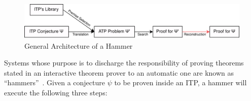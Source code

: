 \begin{figure}[t]
  \includegraphics[scale=0.15]{img/hammerArch.png}
  \caption{General Architecture of a Hammer}\label{fig:archHamm}
\end{figure}

\label{sec:hammering}


Systems whose purpose is to discharge the responsibility of proving theorems stated in
an interactive theorem prover to an automatic one are known as ``hammers''~\cite{hammering}.
Given a conjecture $\psi$ to be proven inside an ITP, a hammer will execute the following three steps:

